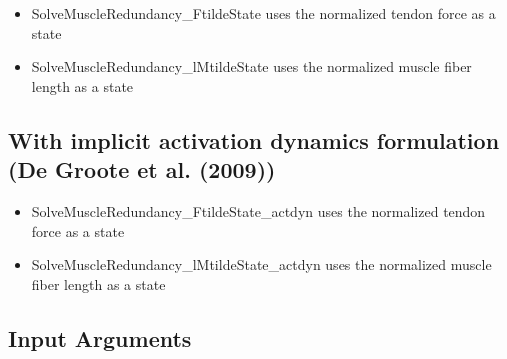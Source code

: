 \documentclass[a4paper,oneside,11pt]{article}
\begin{document}
\begin{itemize}
\item SolveMuscleRedundancy_FtildeState uses the normalized tendon force as a state
\item SolveMuscleRedundancy_lMtildeState uses the normalized muscle fiber length as a state
\end{itemize}

\subsection{With implicit activation dynamics formulation (De Groote et al. (2009))}

\begin{itemize}
\item SolveMuscleRedundancy_FtildeState_actdyn uses the normalized tendon force as a state
\item SolveMuscleRedundancy_lMtildeState_actdyn uses the normalized muscle fiber length as a state
\end{itemize}


\subsection{Input Arguments}
\end{document}
